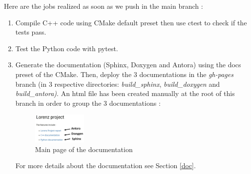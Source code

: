 	\noindent Here are the jobs realized as soon as we push in the main branch :
	\begin{enumerate}[label=\textbullet]
		\item Compile C++ code using CMake default preset then use ctest to check if the tests pass.
		\item Test the Python code with pytest.
		\item Generate the documentation (Sphinx, Doxygen and Antora) using the docs preset of the CMake. Then, deploy the 3 documentations in the \textit{gh-pages} branch (in 3 respective directories: \textit{build\_sphinx}, \textit{build\_doxygen} and \textit{build\_antora)}. An html file has been created manually at the root of this branch in order to group the 3 documentations :
		\begin{figure}[H]
			\centering
			\includegraphics[width=0.25\textwidth]{"images/appendix/html_file.jpg"}
			\caption{Main page of the documentation}
			\label{html_file}
		\end{figure}
		For more details about the documentation see Section \ref{doc}.
	\end{enumerate}